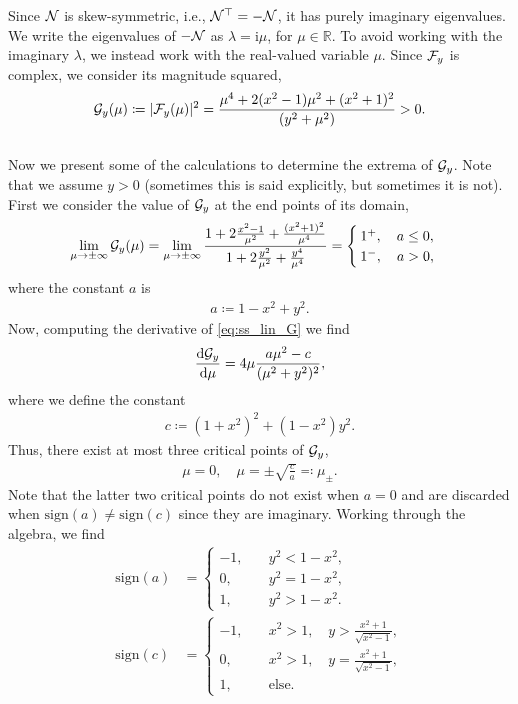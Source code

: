 \documentclass[a4paper,10pt]{article}
\newcommand{\im}{\mathrm{i}}
\begin{document}
Since ${\cal N}$ is skew-symmetric, i.e., ${\cal N}^\top = - {\cal N}$, it has purely imaginary eigenvalues. We write the eigenvalues of $-{\cal N}$ as $\lambda = \im \mu$, for $\mu \in \mathbb{R}$. To avoid working with the imaginary $\lambda$, we instead work with the real-valued variable $\mu$. Since ${\cal F}_y$ is complex, we consider its magnitude squared,
\begin{align}
\label{eq:ss_lin_G}
{\cal G}_y(\mu) \coloneqq |{\cal F}_y(\mu)|^2 = 
\frac{\mu^4 + 2(x^2-1)\mu^2 + (x^2 + 1)^2}{(y^2 + \mu^2)} > 0.
\end{align}\\

Now we present some of the calculations to determine the extrema of ${\cal G}_y$. Note that we assume $y > 0$ (sometimes this is said explicitly, but sometimes it is not). First we consider the value of ${\cal G}_y$ at the end points of its domain,
\begin{align*}
\lim_{\mu \to \pm \infty} {\cal G}_y(\mu) 
=
\lim_{\mu \to \pm \infty} \frac{1 + 2 \frac{x^2-1}{\mu^2} + \frac{(x^2+1)^2}{\mu^4}}{1 + 2 \frac{y^2}{\mu^2} + \frac{y^4}{\mu^4}}
=
\begin{cases}
1^+, \quad a \leq 0, \\
1^-, \quad a > 0,
\end{cases}
\end{align*}
where the constant $a$ is
\begin{align*}
a \coloneqq 1 - x^2  + y^2.
\end{align*}
Now, computing the derivative of \eqref{eq:ss_lin_G} we find
\begin{align*}
\frac{\textrm{d} {\cal G}_y}{\textrm{d} \mu} = 
4 \mu \frac{a \mu^2 - c}{(\mu^2 + y^2)^2},
\end{align*}
where we define the constant
\begin{align*}
c \coloneqq (1+x^2)^2 + (1 - x^2)y^2.
\end{align*}
Thus, there exist at most three critical points of ${\cal G}_y$,
\begin{align*}
\mu = 0, \quad \mu = \pm \sqrt{\frac{c}{a}} \eqqcolon \mu_{\pm}.
\end{align*}
Note that the latter two critical points do not exist when $a = 0$ and are discarded when $\textrm{sign}(a) \neq \textrm{sign}(c)$ since they are imaginary.
Working through the algebra, we find
\begin{align*}
\textrm{sign}(a) 
&=
\begin{cases}
-1, \quad &y^2 < 1 - x^2, \\
0, \quad &y^2 = 1-x^2, \\
1, \quad &y^2 > 1-x^2.
\end{cases} \\
\textrm{sign}(c) 
&=
\begin{cases}
-1, \quad &x^2 > 1, \quad y > \frac{x^2+1}{\sqrt{x^2-1}}, \\
0, \quad &x^2 > 1, \quad y = \frac{x^2+1}{\sqrt{x^2-1}}, \\
1, \quad &\textrm{else}.
\end{cases}
\end{align*}
\end{document}
